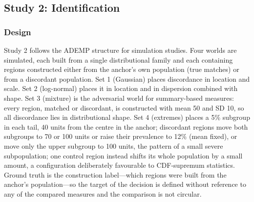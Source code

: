 \documentclass[AMA,Times1COL]{WileyNJDv5}
\begin{document}
\subsection{Study 2: Identification}\label{sec:study2}


\subsubsection{Design}\label{sec:study2_design}

Study 2 follows the ADEMP structure for simulation studies.\cite{morris2019} Four worlds are simulated, each built from a single distributional family and each containing regions constructed either from the anchor's own population (true matches) or from a discordant population. Set 1 (Gaussian) places discordance in location and scale. Set 2 (log-normal) places it in location and in dispersion combined with shape. Set 3 (mixture) is the adversarial world for summary-based measures: every region, matched or discordant, is constructed with mean 50 and SD 10, so all discordance lies in distributional shape. Set 4 (extremes) places a 5\% subgroup in each tail, 40 units from the centre in the anchor; discordant regions move both subgroups to 70 or 100 units or raise their prevalence to 12\% (mean fixed), or move only the upper subgroup to 100 units, the pattern of a small severe subpopulation; one control region instead shifts its whole population by a small amount, a configuration deliberately favourable to CDF-supremum statistics. Ground truth is the construction label---which regions were built from the anchor's population---so the target of the decision is defined without reference to any of the compared measures and the comparison is not circular.
\end{document}
